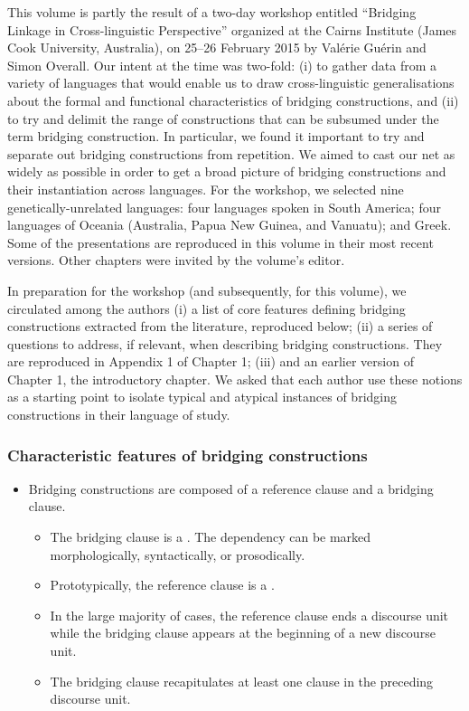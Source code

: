 \begin{refsection}


This volume is partly the result of a two-day workshop entitled ``Bridging Linkage in Cross-linguistic Perspective'' organized at the Cairns Institute (James Cook University, Australia), on 25--26 February 2015 by Valérie Guérin and Simon Overall. Our intent at the time was two-fold: (i) to gather data from a variety of languages that would enable us to draw cross-linguistic generalisations about the formal and functional characteristics of bridging constructions, and (ii) to try and delimit the range of constructions that can be subsumed under the term bridging construction. In particular, we found it important to try and separate out bridging constructions from repetition. We aimed to cast our net as widely as possible in order to get a broad picture of bridging constructions and their instantiation across languages. For the workshop, we selected  nine genetically-unrelated languages: four languages spoken in South America; four languages of Oceania (Australia, Papua New Guinea, and Vanuatu); and Greek. Some of the presentations are reproduced in this volume in their most recent versions. Other chapters were invited by the volume’s editor. 

In preparation for the workshop (and subsequently, for this volume), we circulated among the authors (i) a list of core features defining bridging constructions extracted from the literature, reproduced below; (ii) a series of questions to address, if relevant, when describing bridging constructions. They are reproduced in Appendix 1 of Chapter 1; (iii) and an earlier version of Chapter 1, the introductory chapter. We asked that each author use these notions as a starting point to isolate typical and atypical instances of bridging constructions in their language of study. 



\subsubsection*{Characteristic features of bridging constructions}


\begin{itemize}
\item Bridging constructions are composed of a reference clause and a bridging clause. 
   \begin{itemize}
   \item The bridging clause is a . The dependency can be marked morphologically, syntactically, or prosodically.
   \item  Prototypically, the reference clause is a . 
   \item In the large majority of cases, the reference clause ends a discourse unit while the bridging clause appears at the beginning of a new discourse unit.
   \item  The bridging clause recapitulates at least one clause in the preceding discourse unit. 
   \end{itemize}
   \end{itemize}
   

\end{refsection}
